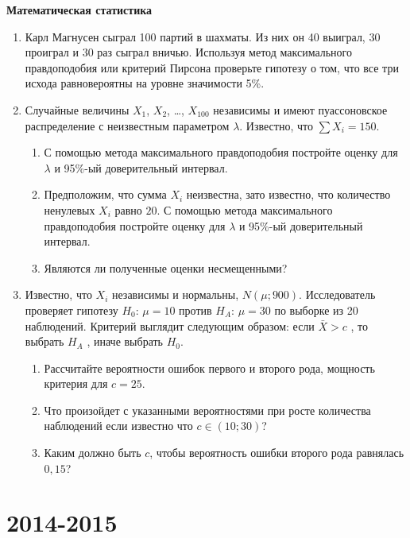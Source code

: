 \documentclass[12pt, a4paper]{article}\usepackage[]{graphicx}\usepackage[]{color}
\begin{document}
				\textbf{Математическая статистика}

				\begin{enumerate}[resume]


					\item Карл Магнусен сыграл 100 партий в шахматы. Из них он 40 выиграл, 30 проиграл и 30 раз сыграл вничью. Используя метод максимального правдоподобия или критерий Пирсона проверьте гипотезу о том, что все три исхода равновероятны на уровне значимости 5\%.


					\item Случайные величины $X_1$, $X_2$, \ldots, $X_{100}$ независимы и имеют пуассоновское распределение с неизвестным параметром $\lambda$. Известно, что $\sum X_i = 150$.
					\begin{enumerate}
						\item С помощью метода максимального правдоподобия постройте оценку для $\lambda$ и 95\%-ый доверительный интервал.
						\item Предположим, что сумма  $X_i$ неизвестна, зато известно, что количество ненулевых $X_i$ равно $20$.  С помощью метода максимального правдоподобия постройте оценку для $\lambda$ и 95\%-ый доверительный интервал.
						\item Являются ли полученные оценки несмещенными?
					\end{enumerate}


					\item  Известно, что  $X_{i}$ независимы и нормальны, $N\left(\mu ;900\right)$.
					Исследователь проверяет гипотезу $H_{0}$: $\mu =10$  против
					$H_{A}$: $\mu =30$  по выборке из 20 наблюдений. Критерий выглядит
					следующим образом: если  $\bar{X}>c$ , то выбрать  $H_{A} $ ,
					иначе выбрать  $H_{0} $.
					\begin{enumerate}
						\item  Рассчитайте вероятности ошибок
						первого и второго рода, мощность критерия для $c=25$.
						\item Что произойдет с указанными вероятностями при росте количества
						наблюдений если известно что $c\in(10;30)$?
						\item Каким должно быть $c$, чтобы вероятность ошибки второго рода
						равнялась $0,15$?
					\end{enumerate}
				\end{enumerate}



				\section{2014-2015}
\end{document}

